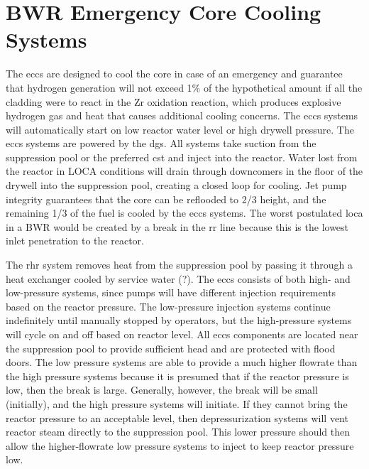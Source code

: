 \documentclass[10pt]{article}
\begin{document}
\section{BWR Emergency Core Cooling Systems}

The \gls{eccs} are designed to cool the core in case of an emergency and guarantee that hydrogen generation will not exceed 1\% of the hypothetical amount if all the cladding were to react in the Zr oxidation reaction, which produces explosive hydrogen gas and heat that causes additional cooling concerns. The \gls{eccs} systems will automatically start on low reactor water level or high drywell pressure. The \gls{eccs} systems are powered by the \gls{dg}s. All systems take suction from the suppression pool or the preferred \gls{cst} and inject into the reactor. Water lost from the reactor in LOCA conditions will drain through downcomers in the floor of the drywell into the suppression pool, creating a closed loop for cooling. Jet pump integrity guarantees that the core can be reflooded to 2/3 height, and the remaining 1/3 of the fuel is cooled by the \gls{eccs} systems. The worst postulated \gls{loca} in a BWR would be created by a break in the \gls{rr} line because this is the lowest inlet penetration to the reactor.  

The \gls{rhr} system removes heat from the suppression pool by passing it through a heat exchanger cooled by service water (?). The \gls{eccs} consists of both high- and low-pressure systems, since pumps will have different injection requirements based on the reactor pressure. The low-pressure injection systems continue indefinitely until manually stopped by operators, but the high-pressure systems will cycle on and off based on reactor level. All \gls{eccs} components are located near the suppression pool to provide sufficient head and are protected with flood doors. The low pressure systems are able to provide a much higher flowrate than the high pressure systems because it is presumed that if the reactor pressure is low, then the break is large. Generally, however, the break will be small (initially), and the high pressure systems will initiate. If they cannot bring the reactor pressure to an acceptable level, then depressurization systems will vent reactor steam directly to the suppression pool. This lower pressure should then allow the higher-flowrate low pressure systems to inject to keep reactor pressure low. 
\end{document}
